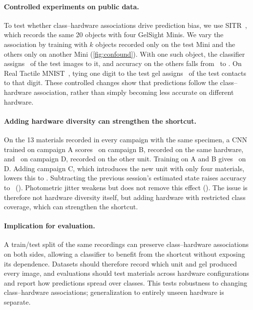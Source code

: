 \paragraph{Controlled experiments on public data.}
To test whether class--hardware associations drive prediction bias, we use SITR~\cite{sitr2025}, which records the same 20 objects with four GelSight Minis. We vary the association by training with $k$ objects recorded only on the test Mini and the others only on another Mini (\cref{fig:confound}). With one such object, the classifier assigns \CfSitrRawOneTop\pct\ of the test images to it, and accuracy on the others falls from \CfSitrRawZeroCross\ to \CfSitrRawOneCross\pct. On Real Tactile MNIST~\cite{tactilemnist2025}, tying one digit to the test gel assigns \CfTmdRawOneTop\pct\ of the test contacts to that digit. These controlled changes show that predictions follow the class--hardware association, rather than simply becoming less accurate on different hardware.

\paragraph{Adding hardware diversity can strengthen the shortcut.}
On the 13 materials recorded in every campaign with the same specimen, a CNN trained on campaign A scores \ThirteenAtoBRaw\pct\ on campaign B, recorded on the same hardware, and \ThirteenAtoDRaw\pct\ on campaign D, recorded on the other unit. Training on A and B gives \ThirteenABtoDRaw\pct\ on D. Adding campaign C, which introduces the new unit with only four materials, lowers this to \ThirteenABCtoDRaw\pct. Subtracting the previous session's estimated state raises accuracy to \ThirteenABCtoDPrev\pct\ (). Photometric jitter weakens but does not remove this effect (). The issue is therefore not hardware diversity itself, but adding hardware with restricted class coverage, which can strengthen the shortcut.

\paragraph{Implication for evaluation.}
A train/test split of the same recordings can preserve class--hardware associations on both sides, allowing a classifier to benefit from the shortcut without exposing its dependence. Datasets should therefore record which unit and gel produced every image, and evaluations should test materials across hardware configurations and report how predictions spread over classes. This tests robustness to changing class--hardware associations; generalization to entirely unseen hardware is separate.